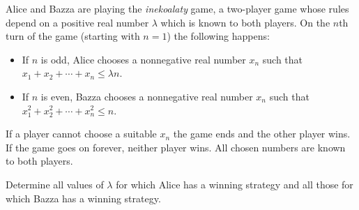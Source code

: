 \begin{problem}
    Alice and Bazza are playing the \textit{inekoalaty} game, a two-player game whose rules depend on a positive real number \( \lambda \) which is known to both players. On the \( n \)th turn of the game (starting with \( n = 1 \)) the following happens:

    \begin{itemize}
        \item If \( n \) is odd, Alice chooses a nonnegative real number \( x_n \) such that \( x_1 + x_2 + \cdots + x_n \leq \lambda n \).

        \item If \( n \) is even, Bazza chooses a nonnegative real number \( x_n \) such that \( x_1^2 + x_2^2 + \cdots + x_n^2 \leq n \).
    \end{itemize}

    If a player cannot choose a suitable \( x_n \) the game ends and the other player wins. If the game goes on forever, neither player wins. All chosen numbers are known to both players.

    Determine all values of \( \lambda \) for which Alice has a winning strategy and all those for which Bazza has a winning strategy.
\end{problem}
